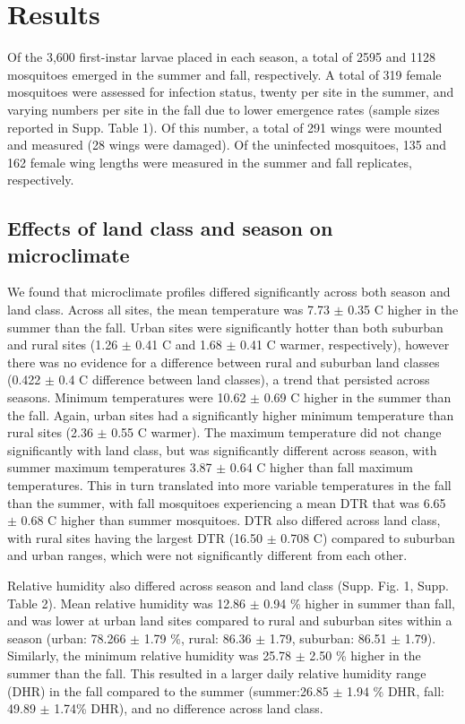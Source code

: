 \documentclass[12pt]{article}
\begin{document}
\section{Results}

Of the 3,600 first-instar larvae placed in each season, a total of 2595 and 1128 mosquitoes emerged in the summer and fall, respectively. A total of 319 female mosquitoes were assessed for infection status, twenty per site in the summer, and varying numbers per site in the fall due to lower emergence rates (sample sizes reported in Supp. Table 1). Of this number, a total of 291 wings were mounted and measured (28 wings were damaged). Of the uninfected mosquitoes, 135 and 162 female wing lengths were measured in the summer and fall replicates, respectively.

\subsection{Effects of land class and season on microclimate}

We found that microclimate profiles differed significantly across both season and land class. Across all sites, the mean temperature was 7.73 $\pm$ 0.35 \degree C higher in the summer than the fall. Urban sites were significantly hotter than both suburban and rural sites (1.26 $\pm$ 0.41 \degree C and 1.68 $\pm$ 0.41 \degree C warmer, respectively), however there was no evidence for a difference between rural and suburban land classes (0.422 $\pm$ 0.4 \degree C difference between land classes), a trend that persisted across seasons.  Minimum temperatures were 10.62 $\pm$ 0.69 \degree C higher in the summer than the fall. Again, urban sites had a significantly higher minimum temperature than rural sites (2.36 $\pm$ 0.55 \degree C warmer). The maximum temperature did not change significantly with land class, but was significantly different across season, with summer maximum temperatures 3.87 $\pm$ 0.64 \degree C higher than fall maximum temperatures. This in turn translated into more variable temperatures in the fall than the summer, with fall mosquitoes experiencing a mean DTR that was 6.65 $\pm$ 0.68 \degree C higher than summer mosquitoes. DTR also differed across land class, with rural sites having the largest DTR (16.50 $\pm$ 0.708 \degree C) compared to suburban and urban ranges, which were not significantly different from each other.

Relative humidity also differed across season and land class (Supp. Fig. 1, Supp. Table 2). Mean relative humidity was 12.86 $\pm$ 0.94 \% higher in summer than fall, and was lower at urban land sites compared to rural and suburban sites within a season (urban: 78.266 $\pm$ 1.79 \%, rural: 86.36 $\pm$ 1.79, suburban: 86.51 $\pm$ 1.79). Similarly, the minimum relative humidity was 25.78 $\pm$ 2.50 \% higher in the summer than the fall. This resulted in a larger daily relative humidity range (DHR) in the fall compared to the summer (summer:26.85 $\pm$ 1.94 \% DHR, fall: 49.89 $\pm$ 1.74\% DHR), and no difference across land class.
\end{document}
